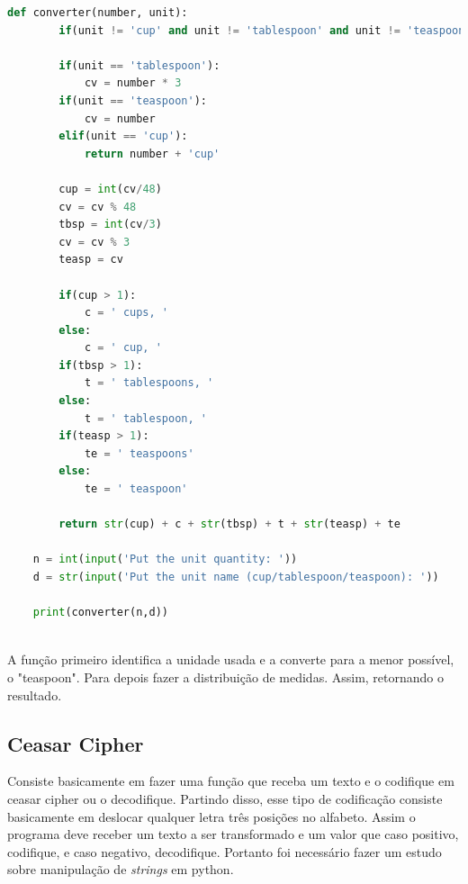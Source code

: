 \begin{lstlisting}[language=python]
    def converter(number, unit):
        if(unit != 'cup' and unit != 'tablespoon' and unit != 'teaspoon'): return 'Invalid unit'
        
        if(unit == 'tablespoon'):
            cv = number * 3
        if(unit == 'teaspoon'):
            cv = number
        elif(unit == 'cup'):
            return number + 'cup'

        cup = int(cv/48)
        cv = cv % 48
        tbsp = int(cv/3)
        cv = cv % 3
        teasp = cv

        if(cup > 1):
            c = ' cups, '
        else:
            c = ' cup, '
        if(tbsp > 1):
            t = ' tablespoons, '
        else:
            t = ' tablespoon, '
        if(teasp > 1):
            te = ' teaspoons'
        else:
            te = ' teaspoon'

        return str(cup) + c + str(tbsp) + t + str(teasp) + te

    n = int(input('Put the unit quantity: '))
    d = str(input('Put the unit name (cup/tablespoon/teaspoon): '))

    print(converter(n,d))
    
\end{lstlisting}

A função primeiro identifica a unidade usada e a converte para a menor possível, o "teaspoon". Para depois fazer a distribuição de medidas. Assim, retornando o resultado.



\subsection{Ceasar Cipher}

Consiste basicamente em fazer uma função que receba um texto e o codifique em ceasar cipher ou o decodifique. Partindo disso, esse tipo de codificação consiste basicamente em deslocar qualquer letra três posições no alfabeto. Assim o programa deve receber um texto a ser transformado e um valor que caso positivo, codifique, e caso negativo, decodifique. Portanto foi necessário fazer um estudo sobre manipulação de \textit{strings} em python.

